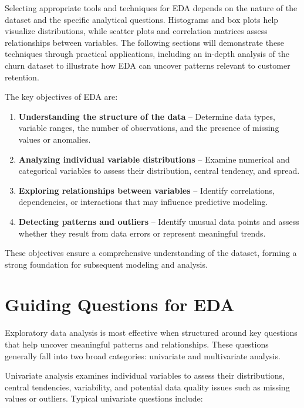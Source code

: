\documentclass[
]{book}
\providecommand{\tightlist}{%
  \setlength{\itemsep}{0pt}\setlength{\parskip}{0pt}}
\theoremstyle{definition}
\theoremstyle{definition}
\theoremstyle{definition}
\theoremstyle{definition}
\theoremstyle{remark}
\begin{document}
Selecting appropriate tools and techniques for EDA depends on the nature of the dataset and the specific analytical questions. Histograms and box plots help visualize distributions, while scatter plots and correlation matrices assess relationships between variables. The following sections will demonstrate these techniques through practical applications, including an in-depth analysis of the churn dataset to illustrate how EDA can uncover patterns relevant to customer retention.

The key objectives of EDA are:

\begin{enumerate}
\def\labelenumi{\arabic{enumi}.}
\tightlist
\item
  \textbf{Understanding the structure of the data} -- Determine data types, variable ranges, the number of observations, and the presence of missing values or anomalies.\\
\item
  \textbf{Analyzing individual variable distributions} -- Examine numerical and categorical variables to assess their distribution, central tendency, and spread.\\
\item
  \textbf{Exploring relationships between variables} -- Identify correlations, dependencies, or interactions that may influence predictive modeling.\\
\item
  \textbf{Detecting patterns and outliers} -- Identify unusual data points and assess whether they result from data errors or represent meaningful trends.
\end{enumerate}

These objectives ensure a comprehensive understanding of the dataset, forming a strong foundation for subsequent modeling and analysis.

\section{Guiding Questions for EDA}\label{guiding-questions-for-eda}

Exploratory data analysis is most effective when structured around key questions that help uncover meaningful patterns and relationships. These questions generally fall into two broad categories: univariate and multivariate analysis.

Univariate analysis examines individual variables to assess their distributions, central tendencies, variability, and potential data quality issues such as missing values or outliers. Typical univariate questions include:
\end{document}
